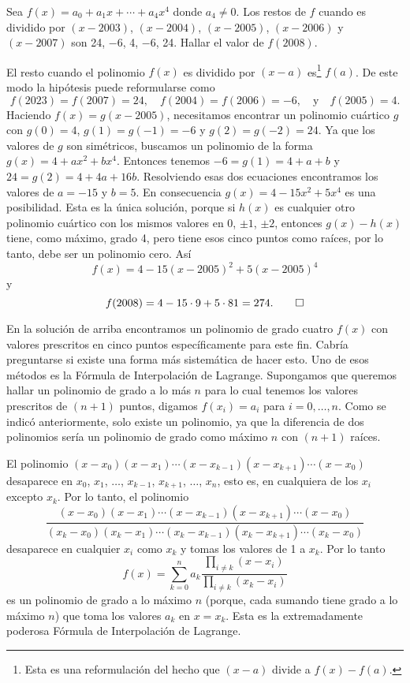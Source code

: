\begin{example}
    Sea $f(x) = a_0 + a_1 x + \cdots + a_4 x^4$ donde $a_4 \neq 0$.
    Los restos de $f$ cuando es dividido por $(x - 2003)$, $(x - 2004)$, $(x - 2005)$, $(x - 2006)$ y $(x - 2007)$ son 24, $-6$, 4, $-6$, 24.
    Hallar el valor de $f(2008)$.
\end{example}
\begin{solution}
    El resto cuando el polinomio $f(x)$ es dividido por $(x - a)$ es\footnote{Esta es una reformulación del hecho que $(x - a)$ divide a $f(x) - f(a)$.} $f(a)$.
    De este modo la hipótesis puede reformularse como
    \[
        f(2023) = f(2007) = 24, \quad f(2004) = f(2006) = -6, \quad \text{y} \quad f(2005) = 4.
    \]
    Haciendo $f(x) = g(x - 2005)$, necesitamos encontrar un polinomio cuártico $g$ con $g(0) = 4$, $g(1) = g(-1) = -6$ y $g(2) = g(-2) = 24$.
    Ya que los valores de $g$ son simétricos, buscamos un polinomio de la forma $g(x) = 4 + ax^2 + bx^4$.
    Entonces tenemos $-6 = g(1) = 4 + a + b$ y $24 = g(2) = 4 + 4a + 16b$.
    Resolviendo esas dos ecuaciones encontramos los valores de $a = -15$ y $b = 5$.
    En consecuencia $g(x) = 4 - 15x^2 + 5x^4$ es una posibilidad.
    Esta es la única solución, porque si $h(x)$ es cualquier otro polinomio cuártico con los mismos valores en 0, $\pm 1$, $\pm 2$, entonces $g(x) - h(x)$ tiene, como máximo, grado 4, pero tiene esos cinco puntos como raíces, por lo tanto, debe ser un polinomio cero.
    Así
    \[
        f(x) = 4 - 15(x - 2005)^2 + 5(x - 2005)^4
    \]
    y
    \[
        f(2008) = 4 - 15\cdot 9 + 5\cdot 81 = 274. \qedhere
    \]
\end{solution}

En la solución de arriba encontramos un polinomio de grado cuatro $f(x)$ con valores prescritos en cinco puntos específicamente para este fin.
Cabría preguntarse si existe una forma más sistemática de hacer esto.
Uno de esos métodos es la Fórmula de Interpolación de Lagrange.
Supongamos que queremos hallar un polinomio de grado a lo más $n$ para lo cual tenemos los valores prescritos de $(n + 1)$ puntos, digamos $f(x_i) = a_i$ para $i = 0, \ldots, n$.
Como se indicó anteriormente, solo existe un polinomio, ya que la diferencia de dos polinomios sería un polinomio de grado como máximo $n$ con $(n + 1)$ raíces.

El polinomio $(x - x_0)(x - x_1)\cdots(x - x_{k - 1})(x - x_{k + 1})\cdots(x - x_0)$ desaparece en $x_0$, $x_1$, $\ldots$, $x_{k - 1}$, $x_{k + 1}$, $\ldots$, $x_n$, esto es, en cualquiera de los $x_i$ excepto $x_k$.
Por lo tanto, el polinomio
\[
    \frac{(x - x_0)(x - x_1)\cdots(x - x_{k - 1})(x - x_{k + 1})\cdots(x - x_0)}{(x_k - x_0)(x_k - x_1)\cdots(x_k - x_{k - 1})(x_k - x_{k + 1})\cdots(x_k - x_0)}
\]
desaparece en cualquier $x_i$ como $x_k$ y tomas los valores de 1 a $x_k$.
Por lo tanto
\[
    f(x) = \sum_{k = 0}^{n} a_k \frac{\prod_{i \neq k} (x - x_i)}{\prod_{i \neq k} (x_k - x_i)}
\]
es un polinomio de grado a lo máximo $n$ (porque, cada sumando tiene grado a lo máximo $n$) que toma los valores $a_k$ en $x = x_k$.
Esta es la extremadamente poderosa Fórmula de Interpolación de Lagrange.

